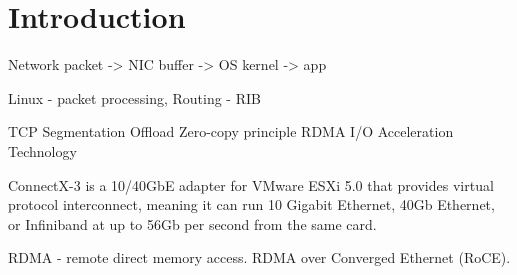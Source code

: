 
\chapter{Introduction}
Network packet -> NIC buffer -> OS kernel -> app

Linux - packet processing,
Routing - RIB

TCP Segmentation Offload
Zero-copy principle
RDMA
I/O Acceleration Technology



ConnectX-3 is a 10/40GbE adapter for VMware ESXi 5.0 that provides virtual protocol interconnect, meaning it can run 10 Gigabit Ethernet, 40Gb Ethernet, or Infiniband at up to 56Gb per second from the same card.

RDMA - remote direct memory access.
RDMA over Converged Ethernet (RoCE).
